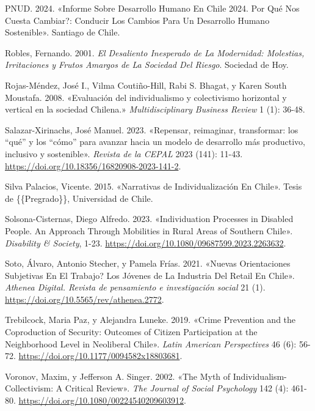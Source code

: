 \documentclass[
  letterpaper,
  DIV=11,
  numbers=noendperiod]{scrartcl}
\newlength{\cslhangindent}
\newenvironment{CSLReferences}[2] %
 {\begin{list}{}{%
  \setlength{\itemindent}{0pt}
  \setlength{\leftmargin}{0pt}
  \setlength{\parsep}{0pt}
  \ifodd #1
   \setlength{\leftmargin}{\cslhangindent}
   \setlength{\itemindent}{-1\cslhangindent}
  \fi
  \setlength{\itemsep}{#2\baselineskip}}}
 {\end{list}}
\begin{document}
\begin{CSLReferences}{1}{0}
PNUD. 2024. {«Informe Sobre {Desarrollo Humano} En {Chile} 2024.
{\textquestiondown}{Por} Qu{é} Nos Cuesta Cambiar?: Conducir Los Cambios
Para Un {Desarrollo Humano Sostenible}»}. Santiago de Chile.

Robles, Fernando. 2001. \emph{El Desaliento Inesperado de La Modernidad:
{Molestias}, Irritaciones y Frutos Amargos de La Sociedad Del Riesgo}.
Sociedad de Hoy.

Rojas-Méndez, José I., Vilma Coutiño-Hill, Rabi S. Bhagat, y Karen South
Moustafa. 2008. {«{Evaluaci{ó}n del individualismo y colectivismo
horizontal y vertical en la sociedad Chilena.}»} \emph{Multidisciplinary
Business Review} 1 (1): 36-48.

Salazar-Xirinachs, José Manuel. 2023. {«{Repensar, reimaginar,
transformar: los {``qu{é}''} y los {``c{ó}mo''} para avanzar hacia un
modelo de desarrollo m{á}s productivo, inclusivo y sostenible}»}.
\emph{Revista de la CEPAL} 2023 (141): 11-43.
\url{https://doi.org/10.18356/16820908-2023-141-2}.

Silva Palacios, Vicente. 2015. {«Narrativas de {Individualizaci{ó}n} En
{Chile}»}. Tesis de \{\{Pregrado\}\}, Universidad de Chile.

Solsona-Cisternas, Diego Alfredo. 2023. {«Individuation Processes in
Disabled People. {An} Approach Through Mobilities in Rural Areas of
Southern {Chile}»}. \emph{Disability \& Society}, 1-23.
\url{https://doi.org/10.1080/09687599.2023.2263632}.

Soto, Álvaro, Antonio Stecher, y Pamela Frías. 2021.
{«{\textquestiondown}{Nuevas} Orientaciones Subjetivas En El Trabajo?
{Los} J{ó}venes de La Industria Del Retail En {Chile}»}. \emph{Athenea
Digital. Revista de pensamiento e investigaci{ó}n social} 21 (1).
\url{https://doi.org/10.5565/rev/athenea.2772}.

Trebilcock, Maria Paz, y Alejandra Luneke. 2019. {«Crime {Prevention}
and the {Coproduction} of {Security}: {Outcomes} of {Citizen
Participation} at the {Neighborhood Level} in {Neoliberal Chile}»}.
\emph{Latin American Perspectives} 46 (6): 56-72.
\url{https://doi.org/10.1177/0094582x18803681}.

Voronov, Maxim, y Jefferson A. Singer. 2002. {«The {Myth} of
{Individualism-Collectivism}: {A Critical Review}»}. \emph{The Journal
of Social Psychology} 142 (4): 461-80.
\url{https://doi.org/10.1080/00224540209603912}.


\end{CSLReferences}
\end{document}
